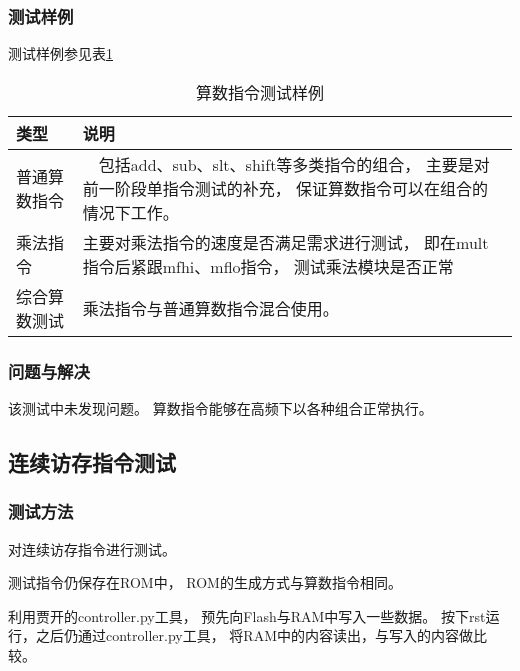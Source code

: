         \subsubsection{测试样例}
            测试样例参见表\ref{arithmetic}
            \begin{table}[!hbp]
            \centering
            \caption{算数指令测试样例}
            \label{arithmetic}
            \begin{tabularx}{\textwidth}{|l|X|}
            \hline
            类型 & 说明 \\
            \hline
            普通算数指令 &　包括add、sub、slt、shift等多类指令的组合，%
                        主要是对前一阶段单指令测试的补充，%
                        保证算数指令可以在组合的情况下工作。  \\
            \hline
            乘法指令 & 主要对乘法指令的速度是否满足需求进行测试，%
                        即在mult指令后紧跟mfhi、mflo指令，%
                        测试乘法模块是否正常  \\
            \hline
            综合算数测试 & 乘法指令与普通算数指令混合使用。 \\
            \hline
            \end{tabularx}
            \end{table}

        \subsubsection{问题与解决}
            该测试中未发现问题。%
            算数指令能够在高频下以各种组合正常执行。


    \subsection{连续访存指令测试}
        \subsubsection{测试方法}
            对连续访存指令进行测试。%

            测试指令仍保存在ROM中，%
            ROM的生成方式与算数指令相同。

            利用贾开的controller.py工具，%
            预先向Flash与RAM中写入一些数据。%
            按下rst运行，之后仍通过controller.py工具，%
            将RAM中的内容读出，与写入的内容做比较。%

